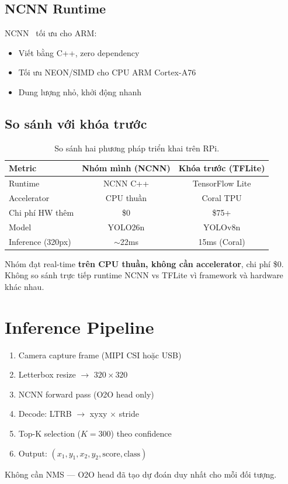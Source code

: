 \subsection{NCNN Runtime}

NCNN~\cite{ncnn} tối ưu cho ARM:
\begin{itemize}
    \item Viết bằng C++, zero dependency
    \item Tối ưu NEON/SIMD cho CPU ARM Cortex-A76
    \item Dung lượng nhỏ, khởi động nhanh
\end{itemize}

\subsection{So sánh với khóa trước}

\begin{table}[H]
\centering
\begin{tabular}{lcc}
\toprule
\textbf{Metric} & \textbf{Nhóm mình (NCNN)} & \textbf{Khóa trước (TFLite)} \\
\midrule
Runtime & NCNN C++ & TensorFlow Lite \\
Accelerator & CPU thuần & Coral TPU \\
Chi phí HW thêm & \$0 & \$75+ \\
Model & YOLO26n & YOLOv8n \\
Inference (320px) & $\sim$22ms & 15ms (Coral) \\
\bottomrule
\end{tabular}
\caption{So sánh hai phương pháp triển khai trên RPi.}
\end{table}

\begin{notebox}
Nhóm đạt real-time \textbf{trên CPU thuần, không cần accelerator}, chi phí \$0. Không so sánh trực tiếp runtime NCNN vs TFLite vì framework và hardware khác nhau.
\end{notebox}

\section{Inference Pipeline}

\begin{enumerate}
    \item Camera capture frame (MIPI CSI hoặc USB)
    \item Letterbox resize $\to$ $320 \times 320$
    \item NCNN forward pass (O2O head only)
    \item Decode: LTRB $\to$ xyxy $\times$ stride
    \item Top-K selection ($K=300$) theo confidence
    \item Output: $(x_1, y_1, x_2, y_2, \text{score}, \text{class})$
\end{enumerate}

Không cần NMS --- O2O head đã tạo dự đoán duy nhất cho mỗi đối tượng.
